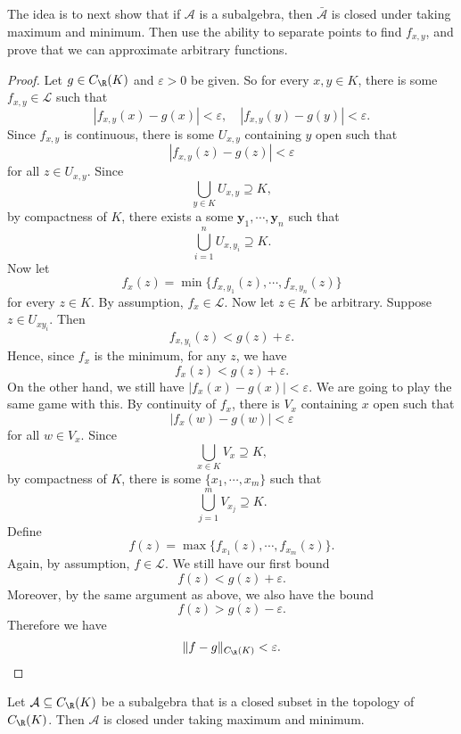 \documentclass[a4paper]{article}
\begin{document}
The idea is to next show that if $\mathcal{A}$ is a subalgebra, then $\bar{\mathcal{A}}$ is closed under taking maximum and minimum. Then use the ability to separate points to find $f_{x, y}$, and prove that we can approximate arbitrary functions.

\begin{proof}
  Let $g \in C_\R(K)$ and $\varepsilon > 0$ be given. So for every $x, y \in K$, there is some $f_{x, y} \in \mathcal{L}$ such that
  \[
    |f_{x, y}(x) - g(x)| < \varepsilon,\quad |f_{x, y}(y) - g(y)| < \varepsilon.
  \]
  Since $f_{x, y}$ is continuous, there is some $U_{x, y}$ containing $y$ open such that
  \[
    |f_{x, y}(z) - g(z)| < \varepsilon
  \]
  for all $z \in U_{x, y}$. Since
  \[
    \bigcup_{y \in K} U_{x, y} \supseteq K,
  \]
  by compactness of $K$, there exists a some $\mathbf{y}_1, \cdots, \mathbf{y}_n$ such that
  \[
    \bigcup_{i = 1}^n U_{x, y_i}\supseteq K.
  \]
  Now let
  \[
    f_x(z) = \min\{f_{x, y_1}(z), \cdots, f_{x, y_n}(z)\}
  \]
  for every $z \in K$. By assumption, $f_x \in \mathcal{L}$. Now let $z \in K$ be arbitrary. Suppose $z \in U_{x y_i}$. Then
  \[
    f_{x, y_i}(z) < g(z) + \varepsilon.
  \]
  Hence, since $f_x$ is the minimum, for any $z$, we have
  \[
    f_x(z) < g(z) + \varepsilon.
  \]
  On the other hand, we still have $|f_x(x) - g(x)| < \varepsilon$. We are going to play the same game with this. By continuity of $f_x$, there is $V_x$ containing $x$ open such that
  \[
    |f_x(w) - g(w)| < \varepsilon
  \]
  for all $w \in V_x$. Since
  \[
    \bigcup_{x\in K} V_x \supseteq K,
  \]
  by compactness of $K$, there is some $\{x_1, \cdots, x_m\}$ such that
  \[
    \bigcup_{j = 1}^m V_{x_j} \supseteq K.
  \]
  Define
  \[
    f(z) = \max\{f_{x_1}(z), \cdots, f_{x_m}(z)\}.
  \]
  Again, by assumption, $f \in \mathcal{L}$. We still have our first bound
  \[
    f(z) < g(z) + \varepsilon.
  \]
  Moreover, by the same argument as above, we also have the bound
  \[
    f(z) > g(z) - \varepsilon.
  \]
  Therefore we have
  \[
    \|f - g\|_{C_\R (K)} < \varepsilon.
  \]
\end{proof}

\begin{lemma}
  Let $\mathcal{A}\subseteq C_\R(K)$ be a subalgebra that is a closed subset in the topology of $C_\R(K)$. Then $\mathcal{A}$ is closed under taking maximum and minimum.
\end{lemma}
\end{document}
